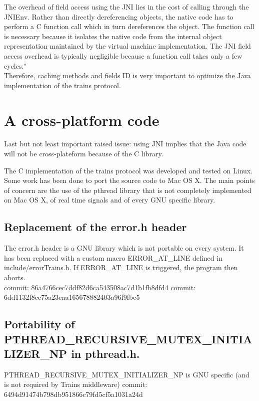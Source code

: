 \documentclass[a4paper,10pt]{report}
\begin{document}
The overhead of field access using the JNI lies in the cost of calling through the JNIEnv. Rather than directly dereferencing objects, 
the native code has to perform a C function call which in turn dereferences the object. The function call is necessary because it 
isolates the native code from the internal object representation maintained by the virtual machine implementation. The JNI field 
access overhead is typically negligible because a function call takes only a few cycles."\\

Therefore, caching methods and fields ID is very important to optimize the Java implementation of the trains protocol.

\section{A cross-platform code}

Last but not least important raised issue: using JNI implies that the Java code will not be cross-plateform because of the C library.

The C implementation of the trains protocol was developed and tested on Linux. Some work has been done to port the source code
to Mac OS X. The main points of concern are the use of the pthread library that is not completely implemented on Mac OS X, 
of real time signals and of every GNU specific library. 

\subsection{Replacement of the error.h header}
    The error.h header is a GNU library which is not portable on every
    system. It has been replaced with a custom macro ERROR\_AT\_LINE defined
    in include/errorTrains.h.
    If ERROR\_AT\_LINE is triggered, the program then aborts.\\

    commit: 86a4766cec7ddf82d6ca543508ac7d1b1fb8dfd4
    commit: 6dd1132f8cc75a23caa165678882403a96f9fbe5

\subsection{Portability of PTHREAD\_RECURSIVE\_MUTEX\_INITIALIZER\_NP in pthread.h.}

    PTHREAD\_RECURSIVE\_MUTEX\_INITIALIZER\_NP is GNU specific (and
    is not required by Trains middleware)
    commit: 6494d91474b798db951866c79fd5cf5a1031a24d
    
\end{document}
